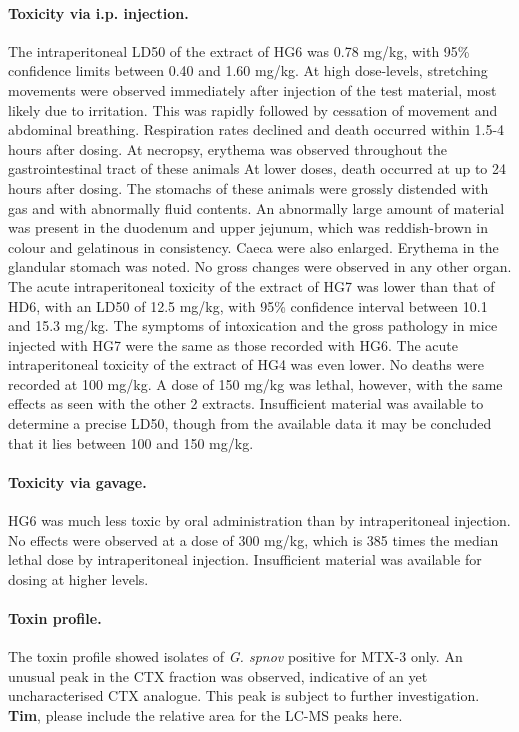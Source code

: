 \documentclass[12pt]{article}
\begin{document}
\paragraph{Toxicity via i.p. injection.}
The intraperitoneal LD50 of the extract of HG6 was 0.78 mg/kg, with 95\% confidence limits between 0.40 and 1.60 mg/kg. At high dose-levels, stretching movements were observed immediately after injection of the test material, most likely due to irritation. This was rapidly followed by cessation of movement and abdominal breathing. Respiration rates declined and death occurred within 1.5-4 hours after dosing. At necropsy, erythema was observed throughout the gastrointestinal tract of these animals At lower doses, death occurred at up to 24 hours after dosing. The stomachs of these animals were grossly distended with gas and with abnormally fluid contents. An abnormally large amount of material was present in the duodenum and upper jejunum, which was reddish-brown in colour and gelatinous in consistency. Caeca were also enlarged. Erythema in the glandular stomach was noted. No gross changes were observed in any other organ. 
The acute intraperitoneal toxicity of the extract of HG7 was lower than that of HD6, with an LD50 of 12.5 mg/kg, with 95\% confidence interval between 10.1 and 15.3 mg/kg. The symptoms of intoxication and the gross pathology in mice injected with HG7 were the same as those recorded with HG6. 
The acute intraperitoneal toxicity of the extract of HG4 was even lower. No deaths were recorded at 100 mg/kg. A dose of 150 mg/kg was lethal, however, with the same effects as seen with the other 2 extracts. Insufficient material was available to determine a precise LD50, though from the available data it may be concluded that it lies between 100 and 150 mg/kg.

\paragraph{Toxicity via gavage.}
 HG6 was much less toxic by oral administration than by intraperitoneal injection. No effects were observed at a dose of 300 mg/kg, which is 385 times the median lethal dose by intraperitoneal injection. Insufficient material was available for dosing at higher levels.​

\paragraph{Toxin profile.}
The toxin profile showed isolates of \emph{G. spnov} positive for MTX-3 only. An unusual peak in the CTX fraction was observed, indicative of an yet uncharacterised CTX analogue. This peak is subject to further investigation. \\ \textbf{Tim}, please include the relative area for the LC-MS peaks here.\\
\end{document}
